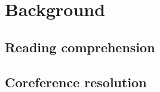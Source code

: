\chapter{Background}
\label{cha:china}

\section{Reading comprehension}
\label{sec:other}

\section{Coreference resolution}
\label{sec:other}
